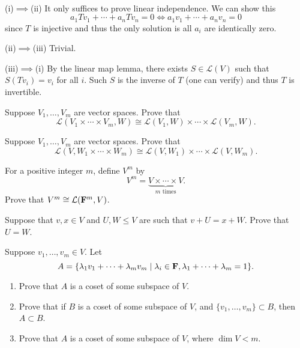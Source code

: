 \begin{solution} \

(i)$\implies$(ii) It only suffices to prove linear independence. We can show this
\[a_1Tv_1+\cdots+a_nTv_n=0\iff a_1v_1+\cdots+a_nv_n=0\]
since $T$ is injective and thus the only solution is all $a_i$ are identically zero.

(ii)$\implies$(iii) Trivial.

(iii)$\implies$(i) By the linear map lemma, there exists $S\in\mathcal{L}(V)$ such that $S(Tv_i)=v_i$ for all $i$. Such $S$ is the inverse of $T$ (one can verify) and thus $T$ is invertible.
\end{solution}

\begin{exercise}
Suppose $V_1,\dots,V_m$ are vector spaces. Prove that
\[\mathcal{L}(V_1\times\cdots\times V_m,W)\cong\mathcal{L}(V_1,W)\times\cdots\times\mathcal{L}(V_m,W).\]
\end{exercise}

\begin{exercise}
Suppose $V_1,\dots,V_m$ are vector spaces. Prove that
\[\mathcal{L}(V,W_1\times\cdots\times W_m)\cong\mathcal{L}(V,W_1)\times\cdots\times\mathcal{L}(V,W_m).\]
\end{exercise}

\begin{exercise}
For a positive integer $m$, define $V^m$ by
\[V^m=\underbrace{V\times\cdots\times V}_{m\text{ times}}.\]
Prove that $V^m\cong\mathcal{L}(\mathbf F^m,V)$.
\end{exercise}

\begin{exercise}
Suppose that $v,x\in V$ and $U,W\le V$ are such that $v+U=x+W$. Prove that $U=W$.
\end{exercise}

\begin{exercise}
Suppose $v_1,\dots,v_m\in V$. Let
\[A=\{\lambda_1v_1+\cdots+\lambda_mv_m\mid\lambda_i\in\mathbf F,\lambda_1+\cdots+\lambda_m=1\}.\]
\begin{enumerate}[label=(\roman*)]
\item Prove that $A$ is a coset of some subspace of $V$.
\item Prove that if $B$ is a coset of some subspace of $V$, and $\{v_1,\dots,v_m\}\subset B$, then $A\subset B$.
\item Prove that $A$ is a coset of some subspace of $V$, where $\dim V<m$.
\end{enumerate}

\end{exercise}

